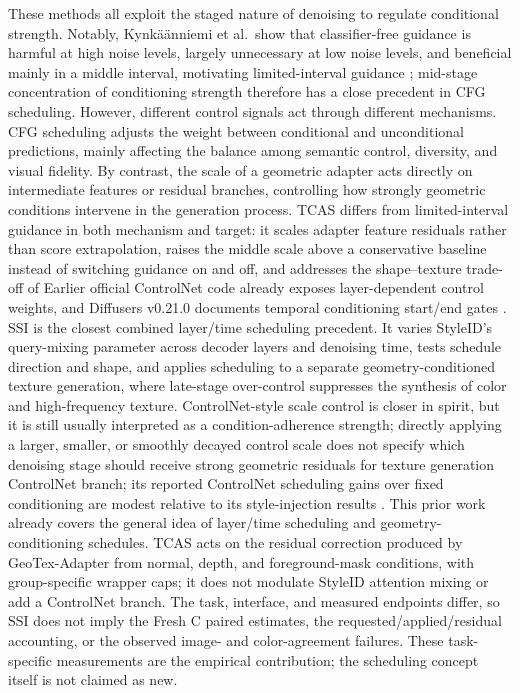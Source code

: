 \documentclass[times,twocolumn,final]{elsarticle}
\providecommand{\DIFadd}[1]{{\protect\color{blue} \sf #1}} %
\providecommand{\DIFdel}[1]{{\protect\color{red} \scriptsize #1}} %
\providecommand{\DIFaddbegin}{} %
\providecommand{\DIFaddend}{} %
\providecommand{\DIFdelbegin}{} %
\providecommand{\DIFdelend}{} %
\begin{document}
\DIFdelbegin \DIFdel{These methods all exploit the staged nature of denoising to regulate conditional strength. Notably, Kynk\"a\"anniemi et al.\ show that classifier-free guidance is harmful at high noise levels, largely unnecessary at low noise levels, and beneficial mainly in a middle interval, motivating limited-interval guidance \cite{kynkanniemi2024limited}; mid-stage concentration of conditioning strength therefore has a close precedent in CFG scheduling. However, different control signals act through different mechanisms. CFG scheduling adjusts the weight between conditional and unconditional predictions, mainly affecting the balance among semantic control, diversity, and visual fidelity. By contrast, the scale of a geometric adapter acts directly on intermediate features or residual branches, controlling how strongly geometric conditions intervene in the generation process. TCAS differs from limited-interval guidance in both mechanism and target: it scales adapter feature residuals rather than score extrapolation, raises the middle scale above a conservative baseline instead of switching guidance on and off, and addresses the shape--texture trade-off of }\DIFdelend \DIFaddbegin \DIFadd{Earlier official ControlNet code already exposes layer-dependent control weights, and Diffusers v0.21.0 documents temporal conditioning start/end gates \cite{controlnet2023layercontrol,diffusers2023controlnet}. SSI is the closest combined layer/time scheduling precedent. It varies StyleID's query-mixing parameter \cite{chung2024styleid} across decoder layers and denoising time, tests schedule direction and shape, and applies scheduling to a separate }\DIFaddend geometry-conditioned \DIFdelbegin \DIFdel{texture generation, where late-stage over-control suppresses the synthesis of color and high-frequency texture. ControlNet-style scale control is closer in spirit, but it is still usually interpreted as a condition-adherence strength; directly applying a larger, smaller, or smoothly decayed control scale does not specify which denoising stage should receive strong geometric residuals for texture generation}\DIFdelend \DIFaddbegin \DIFadd{ControlNet branch; its reported ControlNet scheduling gains over fixed conditioning are modest relative to its style-injection results \cite{kulkarni2026ssi}. This prior work already covers the general idea of layer/time scheduling and geometry-conditioning schedules. TCAS acts on the residual correction produced by GeoTex-Adapter from normal, depth, and foreground-mask conditions, with group-specific wrapper caps; it does not modulate StyleID attention mixing or add a ControlNet branch. The task, interface, and measured endpoints differ, so SSI does not imply the Fresh C paired estimates, the requested/applied/residual accounting, or the observed image- and color-agreement failures. These task-specific measurements are the empirical contribution; the scheduling concept itself is not claimed as new}\DIFaddend .
\end{document}

